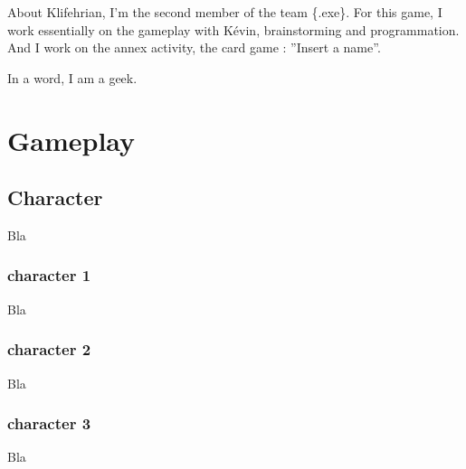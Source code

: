 \documentclass[a4paper,12pt]{book}
\begin{document}
About Klifehrian, I'm the second member of the team \{.exe\}. For this game, I work essentially on the gameplay with K\'{e}vin, brainstorming and programmation. And I work on the annex activity, the card game : ''Insert a name''.

In a word, I am a geek.
\part{Gameplay}
\chapter{Character}
Bla
\section{character 1}
Bla
\section{character 2}
Bla
\section{character 3}
Bla
\end{document}
